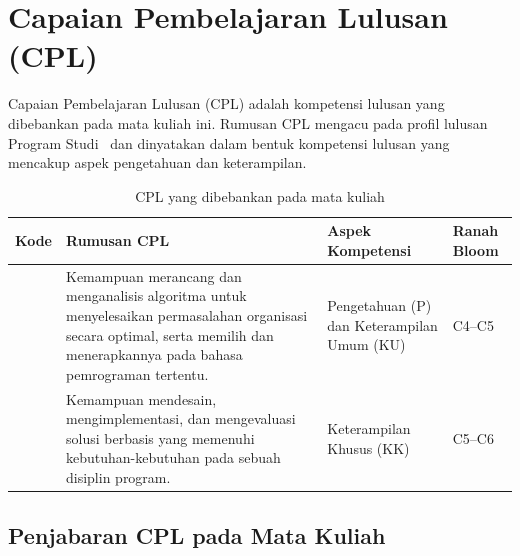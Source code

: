 
\section{Capaian Pembelajaran Lulusan (CPL)}

Capaian Pembelajaran Lulusan (CPL) adalah kompetensi lulusan yang dibebankan
pada mata kuliah ini. Rumusan CPL mengacu pada profil lulusan Program Studi
\NamaProdi\ dan dinyatakan dalam bentuk kompetensi lulusan yang mencakup aspek
pengetahuan dan keterampilan.

\begin{table}[htbp]
\centering
\caption{CPL yang dibebankan pada mata kuliah \NamaMK}
\label{tab:cpl}
\begin{tabularx}{\textwidth}{@{}C{2.0cm}Y C{3.0cm} C{1.8cm}@{}}
\toprule
\headrow \textbf{Kode} & \textbf{Rumusan CPL} & \textbf{Aspek Kompetensi} & \textbf{Ranah Bloom} \\
\midrule
{} &
Kemampuan merancang dan menganalisis algoritma untuk menyelesaikan
permasalahan organisasi secara optimal, serta memilih dan menerapkannya pada
bahasa pemrograman tertentu. &
Pengetahuan (P) dan Keterampilan Umum (KU) &
C4--C5 \\
\addlinespace
{} &
Kemampuan mendesain, mengimplementasi, dan mengevaluasi solusi berbasis
 yang memenuhi kebutuhan-kebutuhan  pada
sebuah disiplin program. &
Keterampilan Khusus (KK) &
C5--C6 \\
\bottomrule
\end{tabularx}
\end{table}

\subsection*{Penjabaran CPL pada Mata Kuliah}

